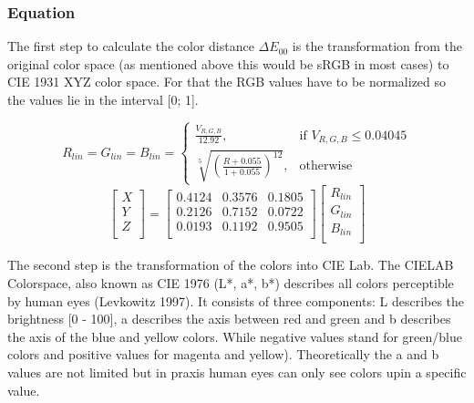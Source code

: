 \subsubsection{Equation}\label{subsec:equation}
The first step to calculate the color distance $\Delta E_{00}$ is the transformation from the original color space (as mentioned above this would be sRGB in most cases) to CIE 1931 XYZ color space. For that the RGB values have to be normalized so the values lie in the interval [0; 1]. 

\begin{equation}
R_{lin} = G_{lin} = B_{lin} =
	\begin{cases}
		\frac{V_{R,G,B}}{12.92}, & \text{if $V_{R,G,B} \leq 0.04045$}\\
		\sqrt[5]{(\frac{R + 0.055}{1 + 0.055})^{12}}, & \text{otherwise}
	\end{cases}
\end{equation}
\begin{equation}
\left[ \begin{array}{r}
X \\ 
Y \\
Z \\ 
\end{array}\right] = \left[ \begin{array}{rrr}
0.4124 & 0.3576 & 0.1805 \\ 
0.2126 & 0.7152 & 0.0722 \\
0.0193 & 0.1192 & 0.9505 \\ 
\end{array}\right] \left[ \begin{array}{r}
R_{lin} \\ 
G_{lin} \\
B_{lin} \\ 
\end{array}\right]
\end{equation}

The second step is the transformation of the colors into CIE Lab. The CIELAB Colorspace, also known as CIE 1976 (L*, a*, b*) describes all colors perceptible by human eyes (Levkowitz 1997). It consists of three components: L describes the brightness [0 - 100], a describes the axis between red and green and b describes the axis of the blue and yellow colors. While negative values stand for green/blue colors and positive values for magenta and yellow). Theoretically the a and b values are not limited but in praxis human eyes can only see colors upin a specific value. 

